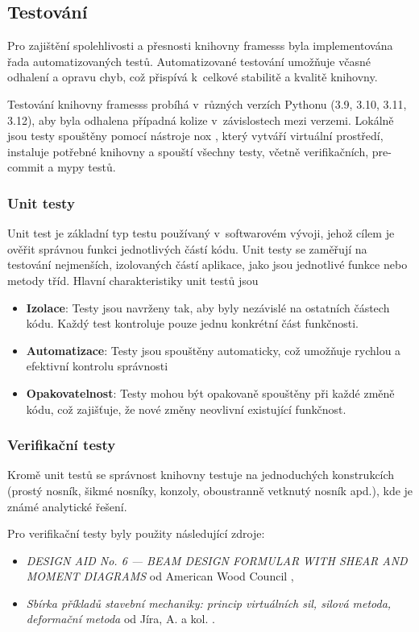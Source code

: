 \subsection{Testování}

Pro zajištění spolehlivosti a přesnosti knihovny framesss byla implementována řada automatizovaných testů. Automatizované testování umožňuje včasné odhalení a opravu chyb, což přispívá k~celkové stabilitě a kvalitě knihovny.

Testování knihovny framesss probíhá v~různých verzích Pythonu (3.9, 3.10, 3.11, 3.12), aby byla odhalena případná kolize v~závislostech mezi verzemi. Lokálně jsou testy spouštěny pomocí nástroje nox \cite{nox}, který vytváří virtuální prostředí, instaluje potřebné knihovny a spouští všechny testy, včetně verifikačních, pre-commit \cite{precommit} a mypy \cite{mypy} testů.

\subsubsection*{Unit testy}
Unit test je základní typ testu používaný v~softwarovém vývoji, jehož cílem je ověřit správnou funkci jednotlivých částí kódu. Unit testy se zaměřují na testování nejmenších, izolovaných částí aplikace, jako jsou jednotlivé funkce nebo metody tříd. Hlavní charakteristiky unit testů jsou
\begin{itemize}
    \item \textbf{Izolace}: Testy jsou navrženy tak, aby byly nezávislé na ostatních částech kódu. Každý test kontroluje pouze jednu konkrétní část funkčnosti.
    \item \textbf{Automatizace}: Testy jsou spouštěny automaticky, což umožňuje rychlou a efektivní kontrolu správnosti
    \item \textbf{Opakovatelnost}: Testy mohou být opakovaně spouštěny při každé změně kódu, což zajišťuje, že nové změny neovlivní existující funkčnost.
\end{itemize}

\subsubsection*{Verifikační testy}
Kromě unit testů se správnost knihovny testuje na jednoduchých konstrukcích (prostý nosník, šikmé nosníky, konzoly, oboustranně vetknutý nosník apd.), kde je známé analytické řešení.

Pro verifikační testy byly použity následující zdroje:
\begin{itemize}
    \item \textit{DESIGN AID No. 6 — BEAM DESIGN FORMULAR WITH SHEAR AND MOMENT DIAGRAMS} od American Wood Council \cite{design_aid},
    \item \textit{Sbírka příkladů stavební mechaniky: princip virtuálních sil, silová metoda, deformační metoda} od Jíra, A. a kol. \cite{sbirka_prikladu}.
\end{itemize}

